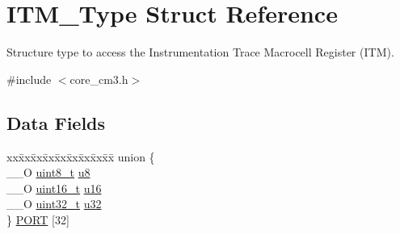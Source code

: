 \hypertarget{struct_i_t_m___type}{\section{I\-T\-M\-\_\-\-Type Struct Reference}
\label{struct_i_t_m___type}
}


Structure type to access the Instrumentation Trace Macrocell Register (I\-T\-M).  




{\ttfamily \#include $<$core\-\_\-cm3.\-h$>$}

\subsection*{Data Fields}
\begin{DoxyCompactItemize}
\item 
\begin{tabbing}
xx\=xx\=xx\=xx\=xx\=xx\=xx\=xx\=xx\=\kill
union \{\\
\>\_\_O \hyperlink{stdint_8h_aba7bc1797add20fe3efdf37ced1182c5}{uint8\_t} \hyperlink{struct_i_t_m___type_abea77b06775d325e5f6f46203f582433}{u8}\\
\>\_\_O \hyperlink{stdint_8h_a273cf69d639a59973b6019625df33e30}{uint16\_t} \hyperlink{struct_i_t_m___type_a12aa4eb4d9dcb589a5d953c836f4e8f4}{u16}\\
\>\_\_O \hyperlink{stdint_8h_a435d1572bf3f880d55459d9805097f62}{uint32\_t} \hyperlink{struct_i_t_m___type_a6882fa5af67ef5c5dfb433b3b68939df}{u32}\\
\} \hyperlink{struct_i_t_m___type_a45e9e82805fec74de6658b2f238f3616}{PORT} \mbox{[}32\mbox{]}\\


\end{tabbing}
\end{DoxyCompactItemize}

